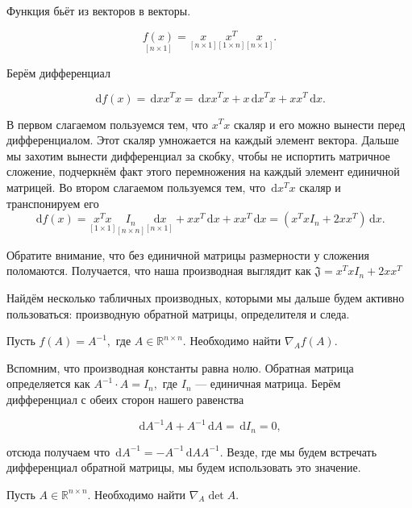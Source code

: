 \documentclass[12pt,fleqn]{article}
\newcommand{\dx}[1]{\,\mathrm{d}#1} %
\begin{document}
\begin{esSolution} Функция бьёт из векторов в векторы. 

\[ 
\underset{[n \times 1]}{f(x)} = \underset{[n \times 1]}{x} \underset{[1 \times n]}{x^T}  \underset{[n \times 1]}{x}.
\]

Берём дифференциал 

\[
\dx{f(x)} = \dx{xx^Tx} = \dx{x}x^Tx + x \dx{x^T} x + xx^T\dx{x}.
\]

В первом слагаемом пользуемся тем, что $x^Tx$ скаляр и его можно вынести перед дифференциалом. Этот скаляр умножается на каждый элемент вектора. Дальше мы захотим вынести дифференциал за скобку, чтобы не испортить матричное сложение, подчеркнём факт этого перемножения на каждый элемент единичной матрицей. Во втором слагаемом пользуемся тем, что $\dx{x^T} x$ скаляр и транспонируем его 
\[
\dx{f(x)} = \underset{[1 \times 1]}{x^Tx} \underset{[n \times n]}{I_n} \underset{[n \times 1]}{\dx{x}} + x x^T \dx{x} + xx^T\dx{x} = (x^Tx I_n + 2 x x^T)\dx{x}.
\]

Обратите внимание, что без единичной матрицы размерности у сложения поломаются. Получается, что наша производная выглядит как $\mathfrak{J} = x^Tx I_n + 2 x x^T$
\end{esSolution}


Найдём несколько табличных производных, которыми мы дальше будем активно пользоваться: производную обратной матрицы, определителя и следа. 

\begin{vkProblem} Пусть  $f(A) = A^{-1},$ где $A \in \mathbb{R}^{n\times n}.$  Необходимо найти $\nabla_A f(A)$.
\end{vkProblem}

\begin{esSolution}
Вспомним, что производная константы равна нолю. Обратная матрица определяется как $A^{-1} \cdot A = I_n,$ где $I_n$ --- единичная матрица. Берём дифференциал с обеих сторон нашего равенства 

\[
\dx{A^{-1}} A + A^{-1} \dx{A} = \dx{I_n} = 0,
\]

отсюда получаем что $\dx{A^{-1}} = - A^{-1} \dx{A} A^{-1}.$ Везде, где мы будем встречать дифференциал обратной матрицы, мы будем использовать это значение. 
\end{esSolution}


\begin{vkProblem} Пусть $A \in \mathbb{R}^{n\times n}$. Необходимо найти $\nabla_A \det A$.
\end{vkProblem}
\end{document}
